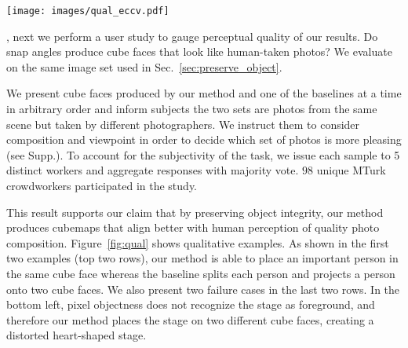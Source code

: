 \begin{figure*}[t!]
\centering
\renewcommand{\tabcolsep}{0pt}
\texttt{[image: images/qual\_eccv.pdf]}%
\caption{Qualitative examples of default \textsc{Canonical} cubemaps and our snap angle cubemaps.  Our method produces cubemaps that place important objects/persons in the same cube face to preserve the foreground integrity. Bottom two rows show failure cases. In the bottom left, pixel objectness~\cite{jain2017pixel} does not recognize the round stage as foreground, and therefore our method splits the stage onto two different cube faces, creating a distorted heart-shaped stage. }
\label{fig:qual}
\end{figure*}






, next we perform a user study to gauge perceptual quality of our results.  Do snap angles produce cube faces that look like human-taken photos?
We evaluate on the same image set used in Sec.~\ref{sec:preserve_object}.


We present cube faces produced by our method and one of the baselines at a time in arbitrary order and inform subjects the two sets are photos from the same scene but taken by different photographers. We instruct them to consider composition and viewpoint in order to decide which set of photos is more pleasing (see Supp.).  
To account for the subjectivity of the task, we issue each sample to 5 distinct workers and aggregate responses with majority vote.  $98$ unique MTurk crowdworkers participated in the study.



This result supports our claim that by preserving object integrity, our method produces cubemaps that align better with human perception of quality photo composition.  
Figure~\ref{fig:qual} shows qualitative examples.  As shown in the first two examples (top two rows), our method is able to place an important person in the same cube face whereas the baseline splits each person and projects a person onto two cube faces.  We also present two failure cases in the last two rows. In the bottom left, pixel objectness does not recognize the stage as foreground, and therefore our method places the stage on two different cube faces, creating a distorted heart-shaped stage. 






